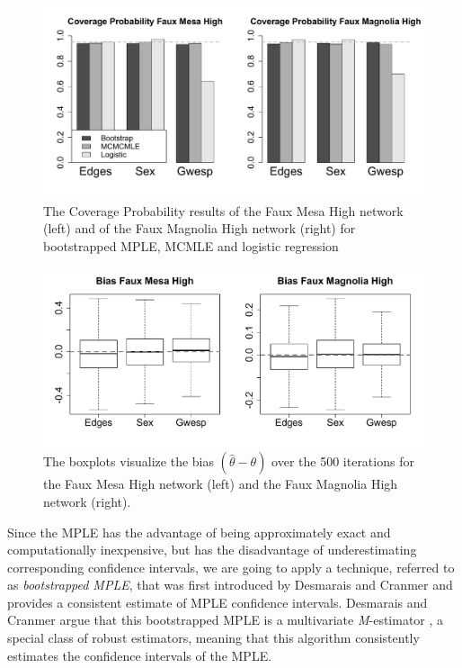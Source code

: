 \documentclass[headsepline=true, abstracton]{scrartcl}
\begin{document}
\begin{figure}[h]
\begin{center}
\includegraphics[scale=.5]{Coverage_Mesa_Magnolia_height05}
\caption{The Coverage Probability results of the Faux Mesa High network (left) and of the Faux Magnolia High network (right) for bootstrapped MPLE, MCMLE and logistic regression }
\label{coverage}
\end{center}
\end{figure}

\begin{figure}[H]
\begin{center}
\includegraphics[scale=.40]{bias_plots_05}
\caption{The boxplots visualize the bias $(\hat{\theta}-\theta)$ over the 500 iterations for the Faux Mesa High network (left) and the Faux Magnolia High network (right).}
\label{bias}
\end{center}
\end{figure}
\noindent Since the MPLE has the advantage of being approximately exact and computationally inexpensive, but has the disadvantage of underestimating corresponding confidence intervals, we are going to apply a technique, referred to as \textit{bootstrapped MPLE}, that was first introduced by Desmarais and Cranmer \cite{Desmarais.2012} and provides a consistent estimate of MPLE confidence intervals. Desmarais and Cranmer argue that this bootstrapped MPLE is a multivariate \textit{M}-estimator \cite{Huber1981}, a special class of robust estimators, meaning that this algorithm consistently estimates the confidence intervals of the MPLE.
\end{document}
